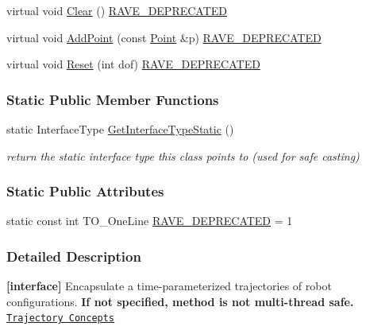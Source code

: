 \begin{DoxyCompactItemize}
virtual void \hyperlink{classOpenRAVE_1_1TrajectoryBase_acff991618208e360f3c8f6af691fb947}{Clear} () \hyperlink{classOpenRAVE_1_1TrajectoryBase_a16220697329e6c8f40dd5e0ec4f4b384}{RAVE\_\-DEPRECATED}
\item 
virtual void \hyperlink{classOpenRAVE_1_1TrajectoryBase_af75c151370d2a44fbd1c94bc2b6b06cd}{AddPoint} (const \hyperlink{classOpenRAVE_1_1TrajectoryBase_1_1Point}{Point} \&p) \hyperlink{classOpenRAVE_1_1TrajectoryBase_a16220697329e6c8f40dd5e0ec4f4b384}{RAVE\_\-DEPRECATED}
\item 
virtual void \hyperlink{classOpenRAVE_1_1TrajectoryBase_acfa84d2797c5b267c12d0ef048493ba0}{Reset} (int dof) \hyperlink{classOpenRAVE_1_1TrajectoryBase_a16220697329e6c8f40dd5e0ec4f4b384}{RAVE\_\-DEPRECATED}
\end{DoxyCompactItemize}
\subsubsection*{Static Public Member Functions}
\begin{DoxyCompactItemize}
\item 
\hypertarget{classOpenRAVE_1_1TrajectoryBase_affeafe65e7c4094f282d273dedbf069b}{
static InterfaceType \hyperlink{classOpenRAVE_1_1TrajectoryBase_affeafe65e7c4094f282d273dedbf069b}{GetInterfaceTypeStatic} ()}
\label{classOpenRAVE_1_1TrajectoryBase_affeafe65e7c4094f282d273dedbf069b}

\begin{DoxyCompactList}\small\item\em return the static interface type this class points to (used for safe casting) \item\end{DoxyCompactList}\end{DoxyCompactItemize}
\subsubsection*{Static Public Attributes}
\begin{DoxyCompactItemize}
\item 
static const int TO\_\-OneLine \hyperlink{classOpenRAVE_1_1TrajectoryBase_a52698d8bfef94dd709800b3ab81fdc7e}{RAVE\_\-DEPRECATED} = 1
\end{DoxyCompactItemize}


\subsubsection{Detailed Description}
{\bfseries \mbox{[}interface\mbox{]}} Encapsulate a time-\/parameterized trajectories of robot configurations. {\bfseries If not specified, method is not multi-\/thread safe.} \href{../main/architecture/trajectory.html}{\tt Trajectory Concepts} 

